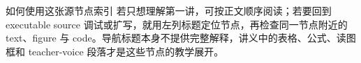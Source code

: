 \begin{knowledgebox}{如何使用这张源节点索引}
若只想理解第一讲，可按正文顺序阅读；若要回到 executable source 调试或扩写，就用左列标题定位节点，再检查同一节点附近的 text、figure 与 code。导航标题本身不提供完整解释，讲义中的表格、公式、读图框和 teacher-voice 段落才是这些节点的教学展开。
\end{knowledgebox}


